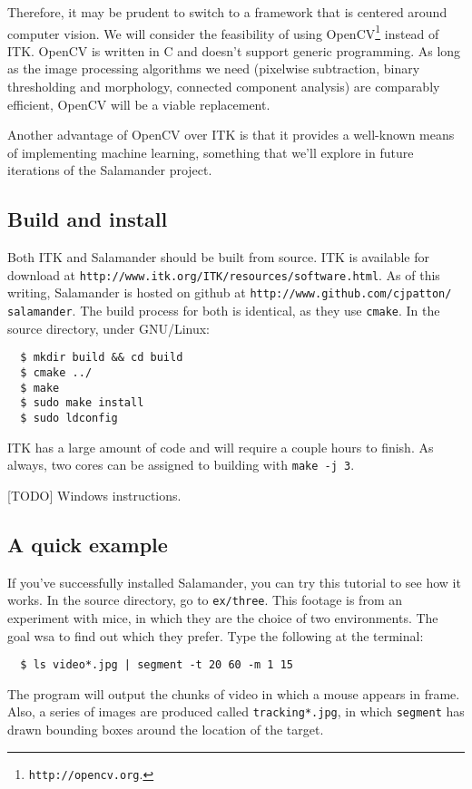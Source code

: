 \documentclass[letter]{article}
\newcounter{foot}
\begin{document}
Therefore, it may be prudent to switch to a framework that is centered around computer 
vision. We will consider the feasibility of using OpenCV\footnote{\texttt{http://opencv.org}.} 
instead of ITK. OpenCV is written in C and doesn't support generic programming. As long
as the image processing algorithms we need (pixelwise subtraction, binary thresholding and
morphology, connected component analysis) are comparably efficient, OpenCV will be a 
viable replacement. 

Another advantage of OpenCV over ITK is that it provides a well-known means of implementing
machine learning, something that we'll explore in future iterations of the Salamander 
project. 

\subsection{Build and install}
Both ITK and Salamander should be built from source. ITK is available for download at 
\texttt{http://www.itk.org/ITK/resources/software.html}. As of this writing, Salamander 
is hosted on github at \texttt{http://www.github.com/cjpatton/ salamander}. The build 
process for both is identical, as they use \texttt{cmake}. In the source directory, 
under GNU/Linux: 
\begin{verbatim}
  $ mkdir build && cd build
  $ cmake ../ 
  $ make
  $ sudo make install 
  $ sudo ldconfig
\end{verbatim}
ITK has a large amount of code and will require a couple hours to finish. As always, 
two cores can be assigned to building with \texttt{make -j 3}. 

[TODO] Windows instructions.

\subsection{A quick example} 
If you've successfully installed Salamander, you can try this tutorial to see how it 
works. In the source directory, go to \texttt{ex/three}. This footage is from an 
experiment with mice, in which they are the choice of two environments. The goal 
wsa to find out which they prefer. Type the following at the terminal:
\begin{verbatim}
  $ ls video*.jpg | segment -t 20 60 -m 1 15 
\end{verbatim}
The program will output the chunks of video in which a mouse appears in frame. Also,
a series of images are produced called \texttt{tracking*.jpg}, in which \texttt{segment}
has drawn bounding boxes around the location of the target. 
\end{document}
